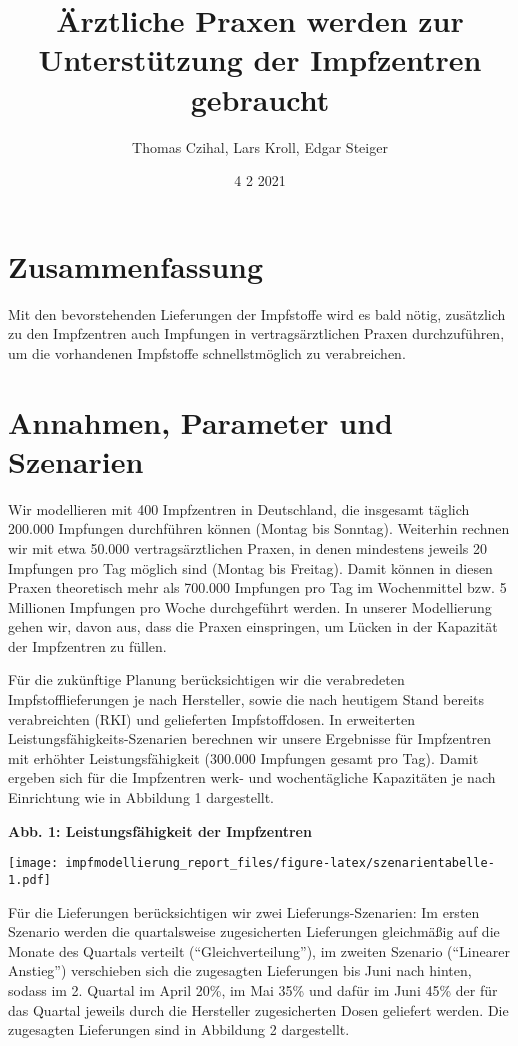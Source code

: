 \documentclass[
]{article}
\title{Ärztliche Praxen werden zur Unterstützung der Impfzentren gebraucht}
\author{Thomas Czihal, Lars Kroll, Edgar Steiger}
\date{4 2 2021}
\begin{document}
\maketitle

\hypertarget{zusammenfassung}{%
\section{Zusammenfassung}\label{zusammenfassung}}

Mit den bevorstehenden Lieferungen der Impfstoffe wird es bald nötig,
zusätzlich zu den Impfzentren auch Impfungen in vertragsärztlichen
Praxen durchzuführen, um die vorhandenen Impfstoffe schnellstmöglich zu
verabreichen.

\hypertarget{annahmen-parameter-und-szenarien}{%
\section{Annahmen, Parameter und
Szenarien}\label{annahmen-parameter-und-szenarien}}

Wir modellieren mit 400 Impfzentren in Deutschland, die insgesamt
täglich 200.000 Impfungen durchführen können (Montag bis Sonntag).
Weiterhin rechnen wir mit etwa 50.000 vertragsärztlichen Praxen, in
denen mindestens jeweils 20 Impfungen pro Tag möglich sind (Montag bis
Freitag). Damit können in diesen Praxen theoretisch mehr als 700.000
Impfungen pro Tag im Wochenmittel bzw. 5 Millionen Impfungen pro Woche
durchgeführt werden. In unserer Modellierung gehen wir, davon aus, dass
die Praxen einspringen, um Lücken in der Kapazität der Impfzentren zu
füllen.

Für die zukünftige Planung berücksichtigen wir die verabredeten
Impfstofflieferungen je nach Hersteller, sowie die nach heutigem Stand
bereits verabreichten (RKI) und gelieferten Impfstoffdosen. In
erweiterten Leistungsfähigkeits-Szenarien berechnen wir unsere
Ergebnisse für Impfzentren mit erhöhter Leistungsfähigkeit (300.000
Impfungen gesamt pro Tag). Damit ergeben sich für die Impfzentren werk-
und wochentägliche Kapazitäten je nach Einrichtung wie in Abbildung 1
dargestellt.

\textbf{Abb. 1: Leistungsfähigkeit der Impfzentren}

\texttt{[image: impfmodellierung\_report\_files/figure-latex/szenarientabelle-1.pdf]}

Für die Lieferungen berücksichtigen wir zwei Lieferungs-Szenarien: Im
ersten Szenario werden die quartalsweise zugesicherten Lieferungen
gleichmäßig auf die Monate des Quartals verteilt (``Gleichverteilung''),
im zweiten Szenario (``Linearer Anstieg'') verschieben sich die
zugesagten Lieferungen bis Juni nach hinten, sodass im 2. Quartal im
April 20\%, im Mai 35\% und dafür im Juni 45\% der für das Quartal
jeweils durch die Hersteller zugesicherten Dosen geliefert werden. Die
zugesagten Lieferungen sind in Abbildung 2 dargestellt.
\end{document}
